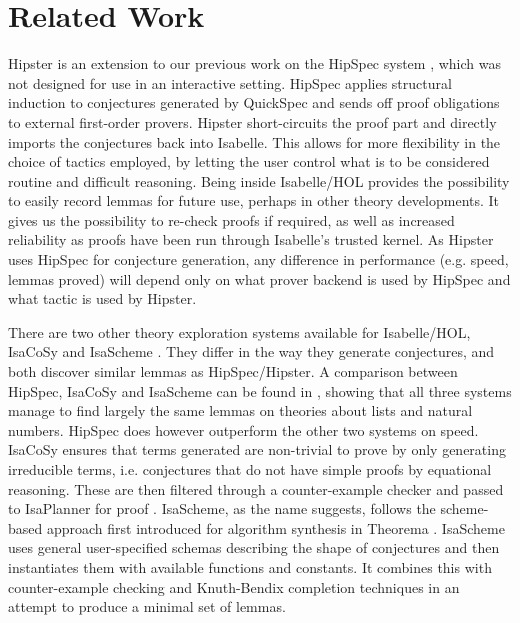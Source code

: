 \section{Related Work}
\label{sec:related}

Hipster is an extension to our previous work on the HipSpec system \cite{hipspecCADE}, which was not designed for use in an interactive setting. HipSpec applies structural induction to conjectures generated by QuickSpec and sends off proof obligations to external first-order provers. Hipster short-circuits the proof part and directly imports the conjectures back into Isabelle. This allows for more flexibility in the choice of tactics employed, by letting the user control what is to be considered routine and difficult reasoning. Being inside Isabelle/HOL provides the possibility to easily record lemmas for future use, perhaps in other theory developments. It gives us the possibility to re-check proofs if required, as well as increased reliability as proofs have been run through Isabelle's trusted kernel. As Hipster uses HipSpec for conjecture generation, any difference in performance (e.g. speed, lemmas proved) will depend only on what prover backend is used by HipSpec and what tactic is used by Hipster. %

There are two other theory exploration systems available for Isabelle/HOL, IsaCoSy \cite{isacosy} and IsaScheme \cite{isascheme}. They differ in the way they generate conjectures, and both discover similar lemmas as HipSpec/Hipster. A comparison between HipSpec, IsaCoSy and IsaScheme can be found in \cite{hipspecCADE}, showing that all three systems manage to find largely the same lemmas on theories about lists and natural numbers. HipSpec does however outperform the other two systems on speed.
IsaCoSy ensures that terms generated are non-trivial to prove by only generating irreducible terms, i.e. conjectures that do not have simple proofs by equational reasoning. These are then filtered through a counter-example checker and passed to IsaPlanner for proof \cite{isaplanner}. IsaScheme, as the name suggests, follows the scheme-based approach first introduced for algorithm synthesis in Theorema \cite{theorema}. IsaScheme uses general user-specified schemas describing the shape of conjectures and then instantiates them with available functions and constants. It combines this with counter-example checking and Knuth-Bendix completion techniques in an attempt to produce a minimal set of lemmas. 

